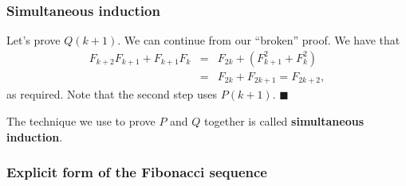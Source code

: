 \begin{frame}\frametitle{Simultaneous induction}
  Let's prove $Q(k+1)$. We can continue from our ``broken'' proof.  We
  have that
  \begin{eqnarray*}
    F_{k+2}F_{k+1}+F_{k+1}F_k
    &=& F_{2k} + (F_{k+1}^2 + F_k^2) \\
    &=& F_{2k} + F_{2k+1} = F_{2k+2},
  \end{eqnarray*}
  as required. Note that the second step uses $P(k+1)$. $\blacksquare$

  \vspace{0.2in}
  The technique we use to prove $P$ and $Q$ together is called {\bf
    simultaneous induction}.
\end{frame}

\begin{frame}\frametitle{Explicit form of the Fibonacci sequence}
\end{frame}
